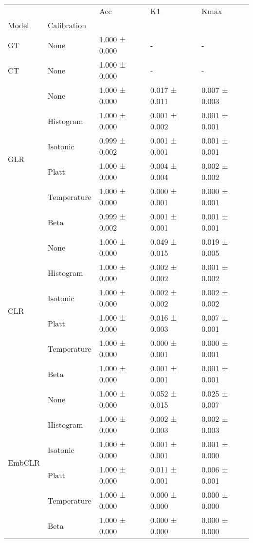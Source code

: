 \begin{tabular}{lllll}
\toprule
 &  & Acc & K1 & Kmax \\
Model & Calibration &  &  &  \\
\midrule
GT & None & 1.000 ± 0.000 & - & - \\
\cline{1-5}
CT & None & 1.000 ± 0.000 & - & - \\
\cline{1-5}
\multirow[t]{6}{*}{GLR} & None & 1.000 ± 0.000 & 0.017 ± 0.011 & 0.007 ± 0.003 \\
 & Histogram & 1.000 ± 0.000 & 0.001 ± 0.002 & 0.001 ± 0.001 \\
 & Isotonic & 0.999 ± 0.002 & 0.001 ± 0.001 & 0.001 ± 0.001 \\
 & Platt & 1.000 ± 0.000 & 0.004 ± 0.004 & 0.002 ± 0.002 \\
 & Temperature & 1.000 ± 0.000 & 0.000 ± 0.001 & 0.000 ± 0.001 \\
 & Beta & 0.999 ± 0.002 & 0.001 ± 0.001 & 0.001 ± 0.001 \\
\cline{1-5}
\multirow[t]{6}{*}{CLR} & None & 1.000 ± 0.000 & 0.049 ± 0.015 & 0.019 ± 0.005 \\
 & Histogram & 1.000 ± 0.000 & 0.002 ± 0.002 & 0.001 ± 0.002 \\
 & Isotonic & 1.000 ± 0.000 & 0.002 ± 0.002 & 0.002 ± 0.002 \\
 & Platt & 1.000 ± 0.000 & 0.016 ± 0.003 & 0.007 ± 0.001 \\
 & Temperature & 1.000 ± 0.000 & 0.000 ± 0.001 & 0.000 ± 0.001 \\
 & Beta & 1.000 ± 0.000 & 0.001 ± 0.001 & 0.001 ± 0.001 \\
\cline{1-5}
\multirow[t]{6}{*}{EmbCLR} & None & 1.000 ± 0.000 & 0.052 ± 0.015 & 0.025 ± 0.007 \\
 & Histogram & 1.000 ± 0.000 & 0.002 ± 0.003 & 0.002 ± 0.003 \\
 & Isotonic & 1.000 ± 0.000 & 0.001 ± 0.001 & 0.001 ± 0.000 \\
 & Platt & 1.000 ± 0.000 & 0.011 ± 0.001 & 0.006 ± 0.001 \\
 & Temperature & 1.000 ± 0.000 & 0.000 ± 0.000 & 0.000 ± 0.000 \\
 & Beta & 1.000 ± 0.000 & 0.000 ± 0.000 & 0.000 ± 0.000 \\
\cline{1-5}
\bottomrule
\end{tabular}
